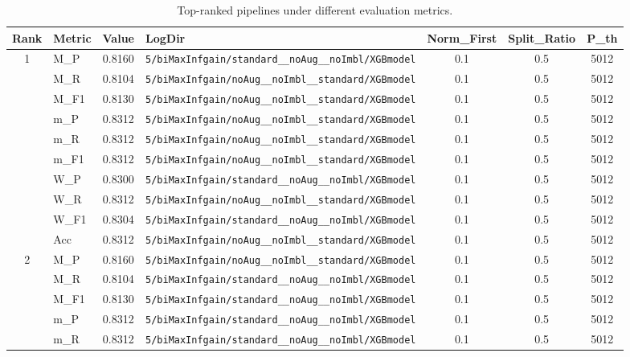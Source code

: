 \begin{table}[htbp]
\caption{Top-ranked pipelines under different evaluation metrics.}
\label{tab:rank_metric_vertical}
\centering
\small
\setlength{\tabcolsep}{4pt}
\begin{tabular}{|c|l|c|>{\ttfamily\footnotesize}p{7.2cm}|c|c|c|}
\hline
Rank & Metric & Value & LogDir & Norm\_First & Split\_Ratio & P\_th \\
\hline
\multirow{10}{*}{1} & M\_P & 0.8160 & \texttt{5/biMaxInfgain/standard\_\_noAug\_\_noImbl/XGBmodel} & 0.1 & 0.5  & 5012 \\ 
 & M\_R & 0.8104 & \texttt{5/biMaxInfgain/noAug\_\_noImbl\_\_standard/XGBmodel} & 0.1 & 0.5  & 5012 \\ 
 & M\_F1 & 0.8130 & \texttt{5/biMaxInfgain/noAug\_\_noImbl\_\_standard/XGBmodel} & 0.1 & 0.5  & 5012 \\ 
 & m\_P & 0.8312 & \texttt{5/biMaxInfgain/noAug\_\_noImbl\_\_standard/XGBmodel} & 0.1 & 0.5  & 5012 \\ 
 & m\_R & 0.8312 & \texttt{5/biMaxInfgain/noAug\_\_noImbl\_\_standard/XGBmodel} & 0.1 & 0.5  & 5012 \\ 
 & m\_F1 & 0.8312 & \texttt{5/biMaxInfgain/noAug\_\_noImbl\_\_standard/XGBmodel} & 0.1 & 0.5  & 5012 \\ 
 & W\_P & 0.8300 & \texttt{5/biMaxInfgain/standard\_\_noAug\_\_noImbl/XGBmodel} & 0.1 & 0.5  & 5012 \\ 
 & W\_R & 0.8312 & \texttt{5/biMaxInfgain/noAug\_\_noImbl\_\_standard/XGBmodel} & 0.1 & 0.5  & 5012 \\ 
 & W\_F1 & 0.8304 & \texttt{5/biMaxInfgain/standard\_\_noAug\_\_noImbl/XGBmodel} & 0.1 & 0.5  & 5012 \\ 
 & Acc & 0.8312 & \texttt{5/biMaxInfgain/noAug\_\_noImbl\_\_standard/XGBmodel} & 0.1 & 0.5  & 5012 \\ 
\hline
\multirow{10}{*}{2} & M\_P & 0.8160 & \texttt{5/biMaxInfgain/noAug\_\_noImbl\_\_standard/XGBmodel} & 0.1 & 0.5  & 5012 \\ 
 & M\_R & 0.8104 & \texttt{5/biMaxInfgain/standard\_\_noAug\_\_noImbl/XGBmodel} & 0.1 & 0.5  & 5012 \\ 
 & M\_F1 & 0.8130 & \texttt{5/biMaxInfgain/standard\_\_noAug\_\_noImbl/XGBmodel} & 0.1 & 0.5  & 5012 \\ 
 & m\_P & 0.8312 & \texttt{5/biMaxInfgain/standard\_\_noAug\_\_noImbl/XGBmodel} & 0.1 & 0.5  & 5012 \\ 
 & m\_R & 0.8312 & \texttt{5/biMaxInfgain/standard\_\_noAug\_\_noImbl/XGBmodel} & 0.1 & 0.5  & 5012 \\ 

\end{tabular}
\end{table}
